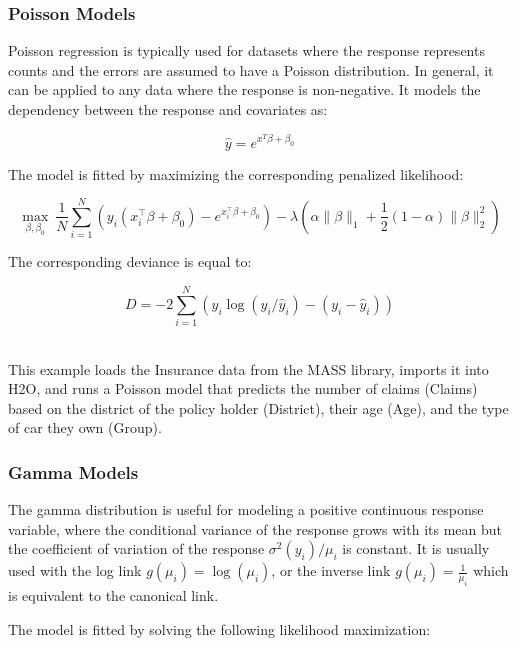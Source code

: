 \subsubsection{Poisson Models}
Poisson regression is typically used for datasets where the response represents counts and the errors are assumed to have a Poisson distribution. In general, it can be applied to any data where the response is non-negative. It models the dependency between the response and covariates as: 

$$\hat{y} = e^{x^T\beta + \beta_0}$$

The model is fitted by maximizing the corresponding penalized likelihood:

$$  \max_{\beta,\beta_0}  \ \frac{1}{N} \sum_{i=1}^{N}  \left(   y_i (x_i^{\top}\beta  + \beta_0) - e^{x_i^{\top}\beta  + \beta_0} \right) 
- \lambda \left(\alpha \|\beta \|_1 + \frac{1}{2}(1-\alpha) \| \beta \|_2^2 \right)$$

\newpage
The corresponding deviance is equal to: 

$$D = -2\sum_{i=1}^{N} \left( y_i \log(y_i/\hat{y}_i) - ( y_i - \hat{y}_i  ) \right)$$

\waterExampleInR
\\
This example loads the Insurance data from the MASS library, imports it into H2O, and runs a Poisson model that predicts the number of claims (Claims) based on the district of the policy holder (District), their age (Age), and the type of car they
own (Group).
\bigskip


\waterExampleInPython


\subsubsection{Gamma Models}
The gamma distribution is useful for modeling a positive continuous response variable, where the conditional
variance of the response grows with its mean but the coefficient of variation of the response $\sigma^2(y_i)/\mu_i$ is
constant. It is usually used with the log link $g(\mu_i)= \log(\mu_i)$, or the inverse link $g(\mu_i) = \frac{1}{\mu_i} $ which is equivalent to the canonical link.

The model is fitted by solving the following likelihood maximization:


